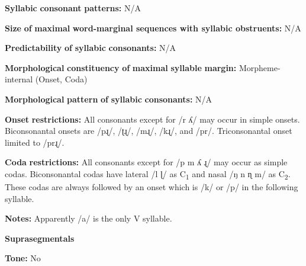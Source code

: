 \documentclass[output=paper]{langsci/langscibook}
\begin{document}
\begin{styleBody}
\textbf{Syllabic} \textbf{consonant} \textbf{patterns:} N/A
\end{styleBody}

\begin{styleBody}
\textbf{Size} \textbf{of} \textbf{maximal} \textbf{word{}-marginal sequences with syllabic obstruents:} N/A
\end{styleBody}

\begin{styleBody}
\textbf{Predictability} \textbf{of} \textbf{syllabic} \textbf{consonants:} N/A
\end{styleBody}

\begin{styleBody}
\textbf{Morphological} \textbf{constituency} \textbf{of} \textbf{maximal} \textbf{syllable} \textbf{margin:} Morpheme-internal (Onset, Coda)
\end{styleBody}

\begin{styleBody}
\textbf{Morphological} \textbf{pattern} \textbf{of} \textbf{syllabic} \textbf{consonants:} N/A
\end{styleBody}

\begin{styleBody}
\textbf{Onset} \textbf{restrictions:} All consonants except for /r ʎ/ may occur in simple onsets. Biconsonantal onsets are /pɻ/, /ʈɻ/, /mɻ/, /kɻ/, and /pr/. Triconsonantal onset limited to /prɻ/.
\end{styleBody}

\begin{styleBody}
\textbf{Coda} \textbf{restrictions:} All consonants except for /p m ʎ ɻ/ may occur as simple codas. Biconsonantal codas have lateral /l ɭ/ as C\textsubscript{1} and nasal /ŋ n ɳ m/ as C\textsubscript{2}. These codas are always followed by an onset which is /k/ or /p/ in the following syllable.
\end{styleBody}

\begin{styleBody}
\textbf{Notes:} Apparently /a/ is the only V syllable.
\end{styleBody}

\begin{styleBody}
\textbf{Suprasegmentals}
\end{styleBody}

\begin{styleBody}
\textbf{Tone:} No
\end{styleBody}
\end{document}

